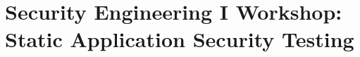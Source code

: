 \documentclass[../main.tex]{subfiles}
\begin{document}
\chapter{Security Engineering I Workshop: Static Application Security Testing}
\label{ch:sast-workshop}

\end{document}
